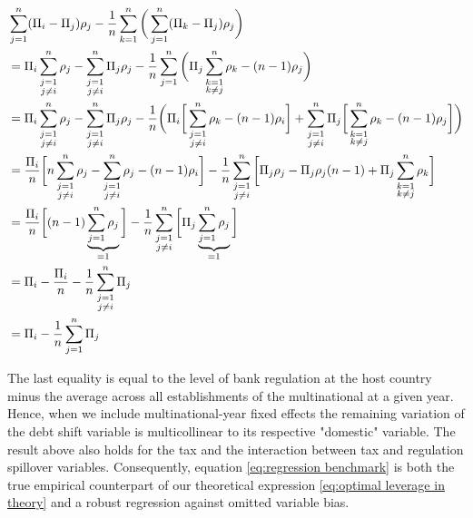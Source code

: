 \documentclass[12pt]{article}
\begin{document}
    \begin{equation*}
    \begin{aligned}
    &\sum_{j=1}^{n}(\Pi_i-\Pi_j)\rho_j-\frac{1}{n}\sum_{k=1}^{n}\bigg(\sum_{j=1}^{n}(\Pi_k-\Pi_j)\rho_j\bigg)\\
    &=\Pi_i\sum_{\mathclap{\substack{j=1\\j\neq i}}}^{n}\rho_j-\sum_{\mathclap{\substack{j=1\\j\neq i}}}^{n}\Pi_j\rho_j-\frac{1}{n}\sum_{j=1}^{n}\bigg(\Pi_j\sum_{\mathclap{\substack{k=1\\k\neq j}}}^{n}\rho_k-(n-1)\rho_j\bigg) \\
    &=\Pi_i\sum_{\mathclap{\substack{j=1\\j\neq i}}}^{n}\rho_j-\sum_{\mathclap{\substack{j=1\\j\neq i}}}^{n}\Pi_j\rho_j-\frac{1}{n}\bigg(\Pi_i\bigg[\sum_{\mathclap{\substack{j=1\\j\neq i}}}^{n} \rho_k-(n-1)\rho_i\bigg] + \sum_{\mathclap{\substack{j=1\\j\neq i}}}^{n} \Pi_j\bigg[ \sum_{\mathclap{\substack{k=1\\k\neq j}}}^{n} \rho_k - (n-1)\rho_j\bigg]\bigg) \\
    &=\frac{\Pi_i}{n}\bigg[n\sum_{\mathclap{\substack{j=1\\j\neq i}}}^{n}\rho_j-\sum_{\mathclap{\substack{j=1\\j\neq i}}}^{n}\rho_j-(n-1)\rho_i\bigg]-\frac{1}{n}\sum_{\mathclap{\substack{j=1\\j\neq i}}}^{n}\bigg[\Pi_j\rho_j-\Pi_j\rho_j(n-1) +\Pi_j\sum_{\mathclap{\substack{k=1\\k\neq j}}}^{n}\rho_k\bigg] \\
    &=\frac{\Pi_i}{n}\bigg[(n-1)\underbrace{\sum_{j=1}^{n}\rho_j}_{=1} \bigg]-\frac{1}{n}\sum_{\mathclap{\substack{j=1\\j\neq i}}}^{n}\bigg[\Pi_j\underbrace{\sum_{j=1}^{n}\rho_j}_{=1}\bigg] \\
    &=\Pi_i-\frac{\Pi_i}{n}-\frac{1}{n}\sum_{\mathclap{\substack{j=1\\j\neq i}}}^{n}\Pi_j \\
    &=\Pi_i-\frac{1}{n}\sum_{j=1}^{n}\Pi_j \\
    \end{aligned}
    \end{equation*}

    The last equality is equal to the level of bank regulation at the host country minus the average across all establishments of the multinational at a given year. Hence, when we include multinational-year fixed effects the remaining variation of the debt shift variable is multicollinear to its respective "domestic" variable. The result above also holds for the tax and the interaction between tax and regulation spillover variables. Consequently, equation \ref{eq:regression benchmark} is both the true empirical counterpart of our theoretical expression \ref{eq:optimal leverage in theory} and a robust regression against omitted variable bias.
\end{document}
